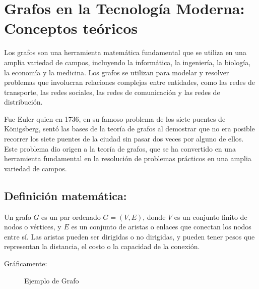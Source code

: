 \documentclass[11pt, a4paper]{article}
\begin{document}
  \section{Grafos en la Tecnología Moderna:  Conceptos teóricos}

  Los grafos son una herramienta matemática fundamental que se utiliza en una amplia variedad de campos, incluyendo la informática, la ingeniería, la biología, la economía y la medicina. Los grafos se utilizan para modelar y resolver problemas que involucran relaciones complejas entre entidades, como las redes de transporte, las redes sociales, las redes de comunicación y las redes de distribución.

  Fue Euler quien en 1736, en su famoso problema de los siete puentes de Königsberg, sentó las bases de la teoría de grafos al demostrar que no era posible recorrer los siete puentes de la ciudad sin pasar dos veces por alguno de ellos. Este problema dio origen a la teoría de grafos, que se ha convertido en una herramienta fundamental en la resolución de problemas prácticos en una amplia variedad de campos.

  \subsection{Definición matemática:}

  Un grafo $G$ es un par ordenado $G = (V, E)$, donde $V$ es un conjunto finito de nodos o vértices, y $E$ es un conjunto de aristas o enlaces que conectan los nodos entre sí. Las aristas pueden ser dirigidas o no dirigidas, y pueden tener pesos que representan la distancia, el costo o la capacidad de la conexión.

  Gráficamente:

  \begin{figure}[H]
    \centering
    \caption{Ejemplo de Grafo}
    \label{fig:ejemplo-grafo}
\end{figure}
\end{document}
